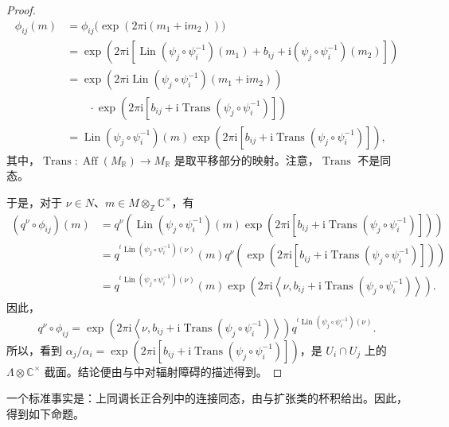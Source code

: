 \begin{proof}
\[
\begin{aligned}
\phi_{ij}(m)
&=\phi_{ij}\bigl(\exp(2\pi\mathrm i(m_1+\mathrm i m_2))\bigr)\\
&=\exp\!\left(2\pi\mathrm i\left[
\operatorname{Lin}(\psi_j\circ\psi_i^{-1})(m_1)+b_{ij}
+\mathrm i(\psi_j\circ\psi_i^{-1})(m_2)\right]\right)\\
&=\exp\!\left(2\pi\mathrm i\operatorname{Lin}(\psi_j\circ\psi_i^{-1})
(m_1+\mathrm i m_2)\right)\\
&\qquad\cdot\exp\!\left(2\pi\mathrm i\left[b_{ij}
+\mathrm i\operatorname{Trans}(\psi_j\circ\psi_i^{-1})\right]\right)\\
&=\operatorname{Lin}(\psi_j\circ\psi_i^{-1})(m)
\exp\!\left(2\pi\mathrm i\left[b_{ij}
+\mathrm i\operatorname{Trans}(\psi_j\circ\psi_i^{-1})\right]\right),
\end{aligned}
\]
其中，$\operatorname{Trans}\colon\operatorname{Aff}(M_{\mathbb R})\to M_{\mathbb R}$ 是取平移部分的映射。注意，$\operatorname{Trans}$ 不是同态。

于是，对于 $\nu\in N$、$m\in M\otimes_{\mathbb Z}\mathbb C^\times$，有
\[
\begin{aligned}
(q^\nu\circ\phi_{ij})(m)
&=q^\nu\!\left(\operatorname{Lin}(\psi_j\circ\psi_i^{-1})(m)
\exp\!\left(2\pi\mathrm i[b_{ij}
+\mathrm i\operatorname{Trans}(\psi_j\circ\psi_i^{-1})]\right)\right)\\
&=q^{{}^t\operatorname{Lin}(\psi_j\circ\psi_i^{-1})(\nu)}(m)
q^\nu\!\left(\exp\!\left(2\pi\mathrm i[b_{ij}
+\mathrm i\operatorname{Trans}(\psi_j\circ\psi_i^{-1})]\right)\right)\\
&=q^{{}^t\operatorname{Lin}(\psi_j\circ\psi_i^{-1})(\nu)}(m)
\exp\!\left(2\pi\mathrm i\left\langle\nu,
b_{ij}+\mathrm i\operatorname{Trans}(\psi_j\circ\psi_i^{-1})\right\rangle\right).
\end{aligned}
\]
因此，
\[
q^\nu\circ\phi_{ij}
=\exp\!\left(2\pi\mathrm i\left\langle\nu,
b_{ij}+\mathrm i\operatorname{Trans}(\psi_j\circ\psi_i^{-1})\right\rangle\right)
q^{{}^t\operatorname{Lin}(\psi_j\circ\psi_i^{-1})(\nu)}.
\]
所以，看到 $\alpha_j/\alpha_i=\exp(2\pi\mathrm i[b_{ij}+\mathrm i\operatorname{Trans}(\psi_j\circ\psi_i^{-1})])$，是 $U_i\cap U_j$ 上的 $\Lambda\otimes\mathbb C^\times$ 截面。结论便由与中对辐射障碍的描述得到。
\end{proof}

一个标准事实是：上同调长正合列中的连接同态，由与扩张类的杯积给出。因此，得到如下命题。

